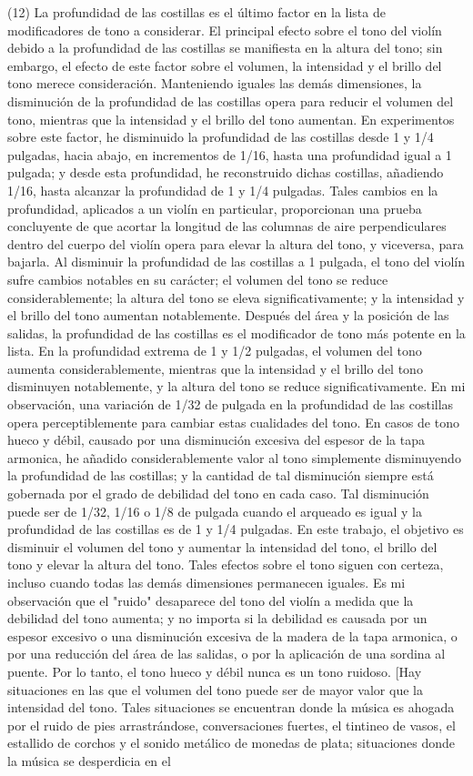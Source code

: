 \documentclass[12pt]{book}
\begin{document}
(12) La profundidad de las costillas es el último factor en la lista de modificadores de tono a considerar. El principal efecto sobre el tono del violín debido a la profundidad de las costillas se manifiesta en la altura del tono; sin embargo, el efecto de este factor sobre el volumen, la intensidad y el brillo del tono merece consideración. Manteniendo iguales las demás dimensiones, la disminución de la profundidad de las costillas opera para reducir el volumen del tono, mientras que la intensidad y el brillo del tono aumentan. En experimentos sobre este factor, he disminuido la profundidad de las costillas desde 1 y 1/4 pulgadas, hacia abajo, en incrementos de 1/16, hasta una profundidad igual a 1 pulgada; y desde esta profundidad, he reconstruido dichas costillas, añadiendo 1/16, hasta alcanzar la profundidad de 1 y 1/4 pulgadas. Tales cambios en la profundidad, aplicados a un violín en particular, proporcionan una prueba concluyente de que acortar la longitud de las columnas de aire perpendiculares dentro del cuerpo del violín opera para elevar la altura del tono, y viceversa, para bajarla. Al disminuir la profundidad de las costillas a 1 pulgada, el tono del violín sufre cambios notables en su carácter; el volumen del tono se reduce considerablemente; la altura del tono se eleva significativamente; y la intensidad y el brillo del tono aumentan notablemente. Después del área y la posición de las salidas, la profundidad de las costillas es el modificador de tono más potente en la lista. En la profundidad extrema de 1 y 1/2 pulgadas, el volumen del tono aumenta considerablemente, mientras que la intensidad y el brillo del tono disminuyen notablemente, y la altura del tono se reduce significativamente. En mi observación, una variación de 1/32 de pulgada en la profundidad de las costillas opera perceptiblemente para cambiar estas cualidades del tono. En casos de tono hueco y débil, causado por una disminución excesiva del espesor de la tapa armonica, he añadido considerablemente valor al tono simplemente disminuyendo la profundidad de las costillas; y la cantidad de tal disminución siempre está gobernada por el grado de debilidad del tono en cada caso. Tal disminución puede ser de 1/32, 1/16 o 1/8 de pulgada cuando el arqueado es igual y la profundidad de las costillas es de 1 y 1/4 pulgadas. En este trabajo, el objetivo es disminuir el volumen del tono y aumentar la intensidad del tono, el brillo del tono y elevar la altura del tono. Tales efectos sobre el tono siguen con certeza, incluso cuando todas las demás dimensiones permanecen iguales. Es mi observación que el "ruido" desaparece del tono del violín a medida que la debilidad del tono aumenta; y no importa si la debilidad es causada por un espesor excesivo o una disminución excesiva de la madera de la tapa armonica, o por una reducción del área de las salidas, o por la aplicación de una sordina al puente. Por lo tanto, el tono hueco y débil nunca es un tono ruidoso. [Hay situaciones en las que el volumen del tono puede ser de mayor valor que la intensidad del tono. Tales situaciones se encuentran donde la música es ahogada por el ruido de pies arrastrándose, conversaciones fuertes, el tintineo de vasos, el estallido de corchos y el sonido metálico de monedas de plata; situaciones donde la música se desperdicia en el 
\end{document}

